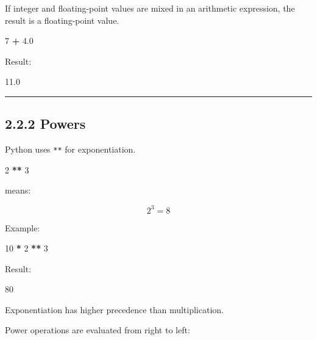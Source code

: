 \documentclass[
]{article}
\newenvironment{Shaded}{\begin{snugshade}}{\end{snugshade}}
\newcommand{\DecValTok}[1]{\textcolor[rgb]{0.00,0.00,0.81}{#1}}
\newcommand{\FloatTok}[1]{\textcolor[rgb]{0.00,0.00,0.81}{#1}}
\newcommand{\NormalTok}[1]{#1}
\newcommand{\OperatorTok}[1]{\textcolor[rgb]{0.81,0.36,0.00}{\textbf{#1}}}
\begin{document}
If integer and floating-point values are mixed in an arithmetic
expression, the result is a floating-point value.

\begin{Shaded}
\begin{Highlighting}[]
\DecValTok{7} \OperatorTok{+} \FloatTok{4.0}
\end{Highlighting}
\end{Shaded}

Result:

\begin{Shaded}
\begin{Highlighting}[]
\NormalTok{11.0}
\end{Highlighting}
\end{Shaded}

\begin{center}\rule{0.5\linewidth}{0.5pt}\end{center}

\subsection{2.2.2 Powers}\label{powers}

Python uses \texttt{**} for exponentiation.

\begin{Shaded}
\begin{Highlighting}[]
\DecValTok{2} \OperatorTok{**} \DecValTok{3}
\end{Highlighting}
\end{Shaded}

means:

\[
2^3 = 8
\]

Example:

\begin{Shaded}
\begin{Highlighting}[]
\DecValTok{10} \OperatorTok{*} \DecValTok{2} \OperatorTok{**} \DecValTok{3}
\end{Highlighting}
\end{Shaded}

Result:

\begin{Shaded}
\begin{Highlighting}[]
\NormalTok{80}
\end{Highlighting}
\end{Shaded}

Exponentiation has higher precedence than multiplication.

Power operations are evaluated from right to left:
\end{document}
